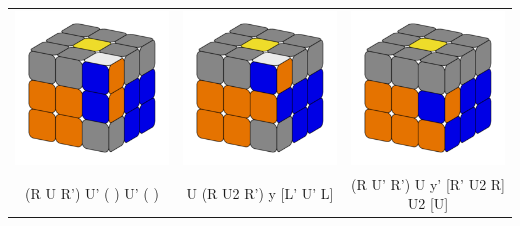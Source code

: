 \documentclass[12pt, a3paper]{article}
\newcommand{\scale}{1}
\begin{document}
\begin{center}
\begin{tabular}{c|c|c}
		\includegraphics[scale=\scale]{20_right} & \includegraphics[scale=\scale]{21_right} & \includegraphics[scale=\scale]{22_right} \\
		(R U R') U' ( ) U' ( ) & U (R U2 R') y [L' U' L] & (R U' R') U y' [R' U2 R] U2 [U] \\
		\hline
	\end{tabular}
\end{center}
\end{document}
